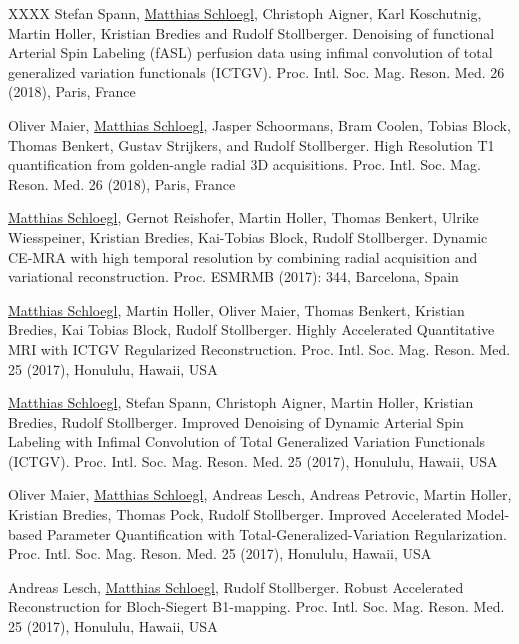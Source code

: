 \begin{thebibliography}{XXXX}
	\newblock Stefan Spann, \underline{Matthias Schloegl}, Christoph Aigner, Karl Koschutnig, Martin Holler, Kristian Bredies and Rudolf Stollberger. 
	\newblock Denoising of functional Arterial Spin Labeling (fASL) perfusion data using infimal convolution of total generalized variation functionals (ICTGV). 
	\newblock Proc. Intl. Soc. Mag. Reson. Med. 26 (2018), Paris, France
	
	\newblock Oliver Maier, \underline{Matthias Schloegl}, Jasper Schoormans, Bram Coolen, Tobias Block, Thomas Benkert, Gustav Strijkers, and Rudolf Stollberger. 
	\newblock High Resolution T1 quantification from golden-angle radial 3D acquisitions. 
	\newblock Proc. Intl. Soc. Mag. Reson. Med. 26 (2018), Paris, France
	
	\newblock \underline{Matthias Schloegl}, Gernot Reishofer, Martin Holler, Thomas Benkert, Ulrike Wiesspeiner, Kristian Bredies, Kai-Tobias Block, Rudolf Stollberger. 
	\newblock Dynamic CE-MRA with high temporal resolution by combining radial acquisition and variational reconstruction.
	\newblock Proc. ESMRMB (2017): 344, Barcelona, Spain

  	\newblock \underline{Matthias Schloegl}, Martin Holler, Oliver Maier, Thomas Benkert, Kristian Bredies, Kai Tobias Block, Rudolf Stollberger.
  	\newblock Highly Accelerated Quantitative MRI with ICTGV Regularized Reconstruction.
  	\newblock Proc. Intl. Soc. Mag. Reson. Med. 25 (2017), Honululu, Hawaii, USA
 
   	\newblock \underline{Matthias Schloegl}, Stefan Spann, Christoph Aigner, Martin Holler, Kristian Bredies, Rudolf Stollberger. 
   	\newblock Improved Denoising of Dynamic Arterial Spin Labeling with Infimal Convolution of Total Generalized Variation Functionals (ICTGV).
   	\newblock Proc. Intl. Soc. Mag. Reson. Med. 25 (2017), Honululu, Hawaii, USA
   
   	\newblock Oliver Maier, \underline{Matthias Schloegl}, Andreas Lesch, Andreas Petrovic, Martin Holler, Kristian Bredies, Thomas Pock, Rudolf Stollberger. 
   	\newblock Improved Accelerated Model-based Parameter Quantification with Total-Generalized-Variation Regularization.
   	\newblock Proc. Intl. Soc. Mag. Reson. Med. 25 (2017), Honululu, Hawaii, USA
   
    \newblock Andreas Lesch, \underline{Matthias Schloegl}, Rudolf Stollberger.
    \newblock Robust Accelerated Reconstruction for Bloch-Siegert B1-mapping.
    \newblock Proc. Intl. Soc. Mag. Reson. Med. 25 (2017), Honululu, Hawaii, USA
    

\end{thebibliography}
